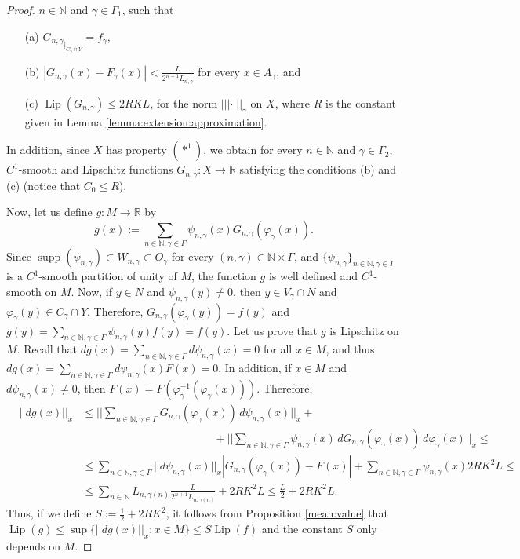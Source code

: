 \documentclass[11pt]{amsart}
\numberwithin{equation}{section}
\begin{document}
\begin{proof}
$n \in \mathbb N$ and $\gamma \in \Gamma_1$, such that
\begin{itemize}
\item[(a)] ${G_{n,\gamma}}_{\mid_{C_\gamma\cap Y}}=f_\gamma$,
\item[(b)] $|G_{n,\gamma}(x)-F_\gamma(x)|< \frac{L}{2^{n+1} L_{n,\gamma}}$ for every $x\in A_\gamma$, and
\item[(c)] ${\operatorname{Lip}}(G_{n,\gamma})\le 2R K L$, for the norm $|||\cdot|||_\gamma$ on $X$, where $R$ is the constant given in Lemma \ref{lemma:extension:approximation}.
\end{itemize}
In addition, since $X$ has  property  $(*^1)$, we obtain for every $n \in \mathbb N$ and $\gamma\in \Gamma_2$,  $C^1$-smooth and Lipschitz functions $G_{n,\gamma}:X\to{\mathbb{R}}$ satisfying the conditions (b) and (c) (notice that $C_0\le R$).

Now, let us define $g:M\to{\mathbb{R}}$ by
\begin{equation*}
g(x):=\sum_{n\in \mathbb N,\gamma\in \Gamma} \psi_{n,\gamma}(x)G_{n,\gamma}(\varphi_\gamma(x)).
\end{equation*}
Since ${\operatorname{supp}}(\psi_{n,\gamma }) \subset W_{n,\gamma}\subset O_\gamma$ for every $(n,\gamma)\in   \mathbb N\times
 \Gamma$, and $\{\psi_{n,\gamma}\}_{n\in \mathbb N,
\gamma \in \Gamma}$ is a $C^1$-smooth partition of unity of $M$, the function $g$ is well defined and  $C^1$-smooth on $M$.
Now, if  $y\in N$ and  $\psi_{n,\gamma}(y)\neq 0$, then $y\in V_\gamma\cap N$ and $\varphi_\gamma(y)\in C_\gamma\cap Y$. Therefore,  $G_{n,\gamma}(\varphi_\gamma(y))=f(y)$ and $g(y)=\sum_{n\in \mathbb N,\gamma \in \Gamma}\psi_{n,\gamma}(y)f(y)=f(y)$. Let us prove that $g$ is Lipschitz on $M$. Recall that  $dg(x)=\sum_{n\in \mathbb N,\gamma \in \Gamma}d\psi_{n,\gamma}(x)=0$ for all $x\in M$, and thus  $dg(x)=\sum_{n\in \mathbb N,\gamma \in \Gamma}d\psi_{n,\gamma}(x)F(x)=0$. In addition, if  $x\in M$ and $d\psi_{n,\gamma}(x)\neq 0$, then $F(x)=F(\varphi_\gamma^{-1}(\varphi_\gamma(x)))$. Therefore,
\begin{eqnarray*}
&||dg(x)||_x&\le ||\sum_{n\in \mathbb N,\gamma \in \Gamma} G_{n,\gamma}(\varphi_\gamma(x))\,d\psi_{n,\gamma}(x)||_x
+ \\
& & \qquad \qquad \qquad \qquad \qquad  \qquad +||\sum_{n\in \mathbb N,\gamma \in \Gamma}\psi_{n,\gamma}(x)\,dG_{n,\gamma}(\varphi_\gamma(x))\,d\varphi_\gamma(x)||_x \le\\
&&\le \sum_{n\in \mathbb N,\gamma \in \Gamma}||d\psi_{n,\gamma}(x)||_x|G_{n,\gamma}(\varphi_\gamma(x))-F(x)|+
\sum_{n\in \mathbb N,\gamma \in \Gamma}\psi_{n,\gamma}(x) 2R K^2L\le \\
&& \le \sum_{n\in \mathbb N}  L_{n,\gamma(n)}\frac{L}{2^{n+1} L_{n,\gamma(n)}}+ 2R K^2 L\le\frac{ L}{2}+2RK^2L.
\end{eqnarray*}
Thus, if we   define $S:=\frac{1}{2}+2RK^2$, it follows from Proposition \ref{mean:value} that  ${\operatorname{Lip}}(g)\le \sup\{||dg(x)||_x:x\in M\}\le S{\operatorname{Lip}}(f)$ and  the constant $S$ only depends on $M$.

 \end{proof}
\end{document}

